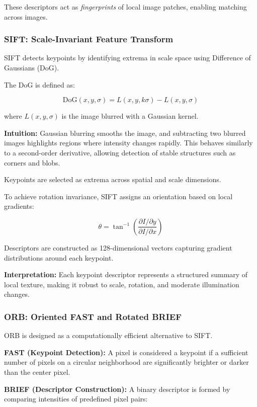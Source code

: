 \documentclass[conference]{IEEEtran}
\begin{document}
These descriptors act as \textit{fingerprints} of local image patches, enabling matching across images.

\subsubsection{SIFT: Scale-Invariant Feature Transform}

SIFT detects keypoints by identifying extrema in scale space using Difference of Gaussians (DoG).

The DoG is defined as:

\[
\text{DoG}(x,y,\sigma) = L(x,y,k\sigma) - L(x,y,\sigma)
\]

where $L(x,y,\sigma)$ is the image blurred with a Gaussian kernel.

\textbf{Intuition:}  
Gaussian blurring smooths the image, and subtracting two blurred images highlights regions where intensity changes rapidly. This behaves similarly to a second-order derivative, allowing detection of stable structures such as corners and blobs.

Keypoints are selected as extrema across spatial and scale dimensions.

To achieve rotation invariance, SIFT assigns an orientation based on local gradients:

\[
\theta = \tan^{-1}\left(\frac{\partial I / \partial y}{\partial I / \partial x}\right)
\]

Descriptors are constructed as 128-dimensional vectors capturing gradient distributions around each keypoint.

\textbf{Interpretation:}  
Each keypoint descriptor represents a structured summary of local texture, making it robust to scale, rotation, and moderate illumination changes.

\subsubsection{ORB: Oriented FAST and Rotated BRIEF \cite{rublee2011orb}}

ORB is designed as a computationally efficient alternative to SIFT.

\textbf{FAST (Keypoint Detection):}  
A pixel is considered a keypoint if a sufficient number of pixels on a circular neighborhood are significantly brighter or darker than the center pixel.

\textbf{BRIEF (Descriptor Construction):}  
A binary descriptor is formed by comparing intensities of predefined pixel pairs:
\end{document}
